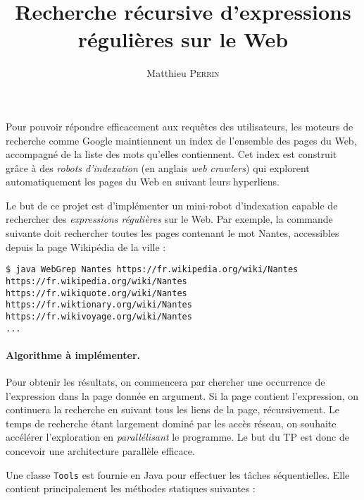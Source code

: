 \documentclass{td}
\author{Matthieu \textsc{Perrin}}
\title{Recherche récursive d'expressions régulières sur le Web}
\begin{document}
\maketitle

Pour pouvoir répondre efficacement aux requêtes des utilisateurs,
les moteurs de recherche comme Google maintiennent un index de l'ensemble des pages du Web,
accompagné de la liste des mots qu'elles contiennent.
Cet index est construit grâce à des \emph{robots d'indexation}
(en anglais \emph{web crawlers})
qui explorent automatiquement les pages du Web en suivant leurs hyperliens.

Le but de ce projet est d'implémenter un mini-robot d'indexation
capable de rechercher des \emph{expressions régulières} sur le Web.
Par exemple, la commande suivante doit rechercher toutes les pages contenant le mot \og{}Nantes\fg{},
accessibles depuis la page Wikipédia de la ville :

\begin{lstlisting}
$ java WebGrep Nantes https://fr.wikipedia.org/wiki/Nantes
https://fr.wikipedia.org/wiki/Nantes
https://fr.wikiquote.org/wiki/Nantes
https://fr.wiktionary.org/wiki/Nantes
https://fr.wikivoyage.org/wiki/Nantes
...
\end{lstlisting}

\paragraph{Algorithme à implémenter.}

Pour obtenir les résultats, on commencera par chercher une occurrence de l'expression dans la page donnée en argument.
Si la page contient l'expression, on continuera la recherche en suivant tous les liens de la page, récursivement.
Le temps de recherche étant largement dominé par les accès réseau, on souhaite accélérer l'exploration
en \emph{parallélisant} le programme.  
Le but du TP est donc de concevoir une architecture parallèle efficace.

Une classe \lstinline{Tools} est fournie en Java pour effectuer les tâches séquentielles.
Elle contient principalement les méthodes statiques suivantes :
\end{document}
